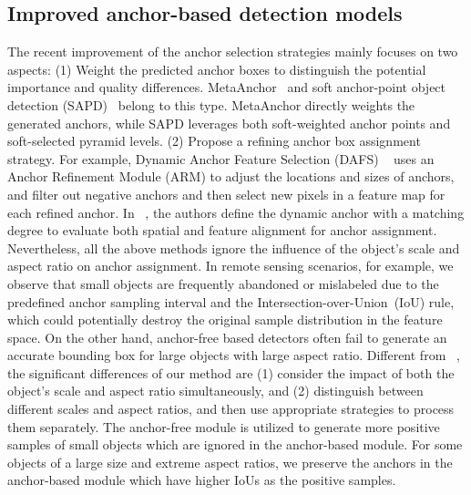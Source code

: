 \documentclass[journal]{IEEEtran}
\begin{document}
\subsection{Improved anchor-based detection models} 
The recent improvement of the anchor selection strategies mainly focuses on two aspects: (1) Weight the predicted anchor boxes to distinguish the potential importance and quality differences. MetaAnchor~\cite{MetaAnchor} and soft anchor-point object detection (SAPD)~\cite{Zhu2020SoftAO} belong to this type. MetaAnchor directly weights the generated anchors, while SAPD leverages both soft-weighted anchor points and soft-selected pyramid levels. (2) Propose a refining anchor box assignment strategy. For example, Dynamic Anchor Feature Selection (DAFS) ~\cite{9009487} uses an Anchor Refinement Module (ARM) to adjust the locations and sizes of anchors, and filter out negative anchors and then select new pixels in a feature map for each refined anchor. 
In ~\cite{ming2020dynamic}, the authors define the dynamic anchor with a matching degree to evaluate both spatial and feature alignment for anchor assignment. 
Nevertheless, all the above methods ignore the influence of the object’s scale and aspect ratio on anchor assignment. In remote sensing scenarios, for example, we observe that small objects are frequently abandoned or mislabeled due to the predefined anchor sampling interval and the Intersection-over-Union~(IoU) rule, which could potentially destroy the original sample distribution in the feature space. On the other hand, anchor-free based detectors often fail to generate an accurate bounding box for large objects with large aspect ratio. 
Different from ~\cite{MetaAnchor, Zhu2020SoftAO, 9009487, ming2020dynamic}, the significant differences of our method are (1) consider the impact of both the object’s scale and aspect ratio simultaneously, and (2) distinguish between different scales and aspect ratios, and then use appropriate strategies to process them separately. The anchor-free module is utilized to generate more positive samples of small objects which are ignored in the anchor-based module. For some objects of a large size and extreme aspect ratios, we preserve the anchors in the anchor-based module which have higher IoUs as the positive samples. 
\end{document}
